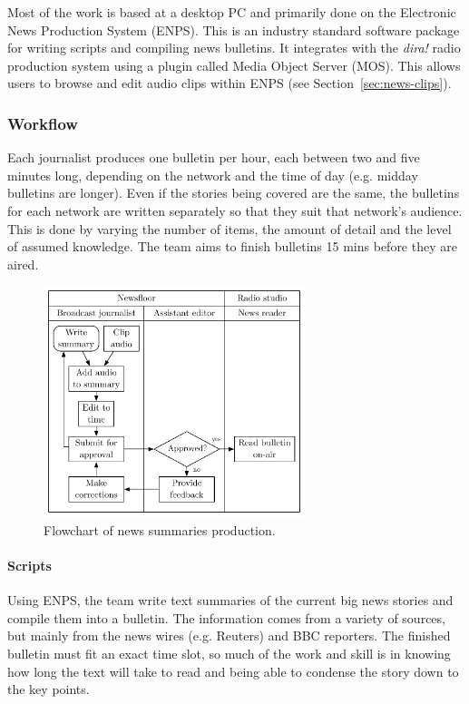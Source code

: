 Most of the work is based at a desktop PC and primarily done on the Electronic News Production System (ENPS). This is
an industry standard software package for writing scripts and compiling news bulletins. It integrates with the
\textit{dira!} radio production system using a plugin called Media Object Server (MOS). This allows users to browse and
edit audio clips within ENPS (see Section~\ref{sec:news-clips}).

\subsubsection{Workflow}
Each journalist produces one bulletin per hour, each between two and five minutes long, depending on the network and
the time of day (e.g. midday bulletins are longer). Even if the stories being covered are the same, the bulletins for
each network are written separately so that they suit that network's audience. This is done by varying the number of
items, the amount of detail and the level of assumed knowledge. The team aims to finish bulletins 15 mins before they
are aired.

\begin{figure}[ht]
  \centering
  \includegraphics[width=3in]{figs/news-workflow.pdf}
  \caption{Flowchart of news summaries production.}
  \label{fig:ethno-drama-recording}
\end{figure}


\paragraph{Scripts}
Using ENPS, the team write text summaries of the current big news stories and compile them into a bulletin. The
information comes from a variety of sources, but mainly from the news wires (e.g. Reuters) and BBC reporters.  The
finished bulletin must fit an exact time slot, so much of the work and skill is in knowing how long the text will take
to read and being able to condense the story down to the key points. 

